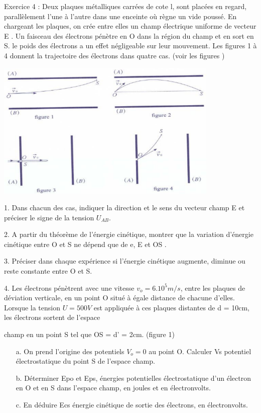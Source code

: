 \documentclass[12pt, french]{article}
\begin{document}
\begin{Box2}{Exercice 4 : }
Deux plaques métalliques carrées de cote l, sont placées en regard, parallèlement l’une à l’autre
dans une enceinte où règne un vide poussé. En chargeant les plaques, on crée entre elles un
champ électrique uniforme de vecteur E . Un faisceau des électrons pénètre en O dans la région
du champ et en sort en S. le poids des électrons a un effet négligeable sur leur mouvement. Les
figures 1 à 4 donnent la trajectoire des électrons dans quatre cas. (voir les figures )
  \begin{center}
    \includegraphics[width=0.8\textwidth]{./img/img_02.png}
  \end{center}
   1. Dans chacun des cas, indiquer la direction et le sens du vecteur champ E et préciser le
   signe de la tension $U_{AB}$.

   2. A partir du théorème de l’énergie cinétique, montrer que la variation d’énergie cinétique
entre O et S ne dépend que de e, E et OS . 

   3. Préciser dans chaque expérience si l’énergie cinétique augmente, diminue ou reste
constante entre O et S.

   4. Les électrons pénètrent avec une vitesse $v_o = 6. 10^5m/s$, entre les plaques de déviation
verticale, en un point O situé à égale distance de chacune d’elles. Lorsque la tension $U=500V$ est appliquée à ces plaques distantes de d = 10cm, les électrons sortent de l’espace

champ en un point S tel que OS = d’ = 2cm. (figure 1)
   \begin{enumerate}
      \item[a.] On prend l’origine des potentiels $V_o = 0$ au point O. Calculer Vs potentiel électrostatique du
point S de l’espace champ. 
\item[b.] Déterminer Epo et Eps, énergies potentielles électrostatique d’un électron en O et en S dans
l’espace champ, en joules et en électronvolts.
         \item[c.] En déduire Ecs énergie cinétique de sortie des électrons, en électronvolts.
   \end{enumerate}
\end{Box2}



\end{document}
